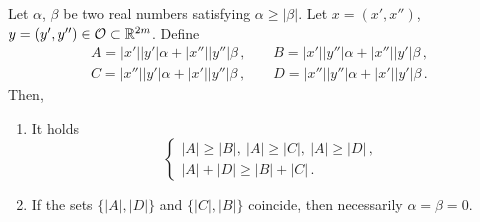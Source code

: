 \begin{lemma}
\label{Lemma:ComputationABCD} Let $\alpha$, $\beta$ be two real numbers satisfying $\alpha \geq
|\beta|$. Let $x=(x',x'')$, $y=(y',y'')\in \mathcal{O} \subset \mathbb{R}^{2m}$. Define
$$
\begin{array}{cc}
	A = |x'||y'|  \alpha + |x''||y''|\beta \,, \ \ \ \ \ &
	B = |x'||y''| \alpha + |x''||y'| \beta \,, \\
	C = |x''||y'| \alpha + |x'||y''| \beta \,, \ \ \ \ \ &
	D = |x''||y''|\alpha + |x'||y'|  \beta \,.
\end{array}
$$
Then,
\begin{enumerate}
\item It holds
$$
\begin{cases}
|A| \geq |B|,\ |A| \geq|C|, \ |A| \geq|D|\,, \\
|A| + |D| \geq |B| + |C|\,.
\end{cases}
$$
\item If  the sets $\{|A|,|D|\}$ and $\{|C|,|B|\}$ coincide, then necessarily $\alpha = \beta = 0$.
\end{enumerate}

\end{lemma}
